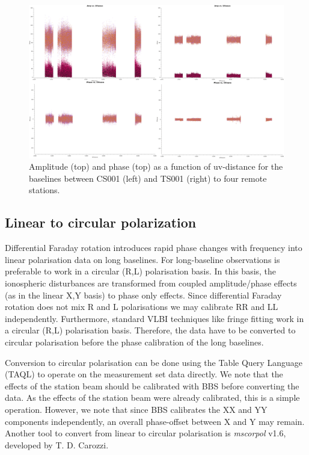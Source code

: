 \documentclass[graybox]{svmult}
\begin{document}
\begin{figure}
\begin{center}
\includegraphics[width=\textwidth]{figures/amp_uv_CSRS_TSRS.png}
\caption{Amplitude (top) and phase (top) as a function of uv-distance for the
baselines between CS001 (left) and TS001 (right) to four remote stations.}
\label{fig:CSvsTS}
\end{center}
\end{figure}


\subsection{Linear to circular polarization}

Differential Faraday rotation introduces rapid phase changes with frequency
into linear polarisation data on long baselines. For long-baseline observations
is preferable to work in a circular (R,L) polarisation basis. In this basis,
the ionospheric disturbances are transformed from coupled amplitude/phase
effects (as in the linear X,Y basis) to phase only effects. Since differential Faraday rotation does not mix R and L
polarisations we may calibrate RR and LL independently. Furthermore, standard VLBI techniques like fringe fitting work in a circular (R,L)
polarisation basis. Therefore, the data have to be converted to circular polarisation before the phase calibration of the long baselines.

Conversion to circular polarisation can be done using the Table Query Language
(TAQL) to operate on the measurement set data directly. We note that the
effects of the station beam should be calibrated with BBS before converting the
data. As the effects of the station beam were already calibrated, this is a
simple operation. However, we note that since BBS calibrates the XX and YY
components independently, an overall phase-offset between X and Y may remain. Another tool to convert from linear to circular polarisation is \emph{mscorpol} v1.6, developed by T. D. Carozzi.
\end{document}
